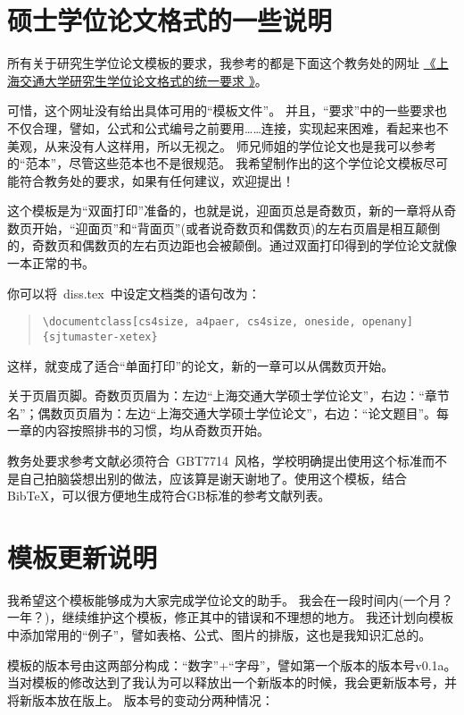 \section{硕士学位论文格式的一些说明}
\label{sec:thesisformat}

所有关于研究生学位论文模板的要求，我参考的都是下面这个教务处的网址
\href{http://www.gs.sjtu.edu.cn/policy/fileShow.ahtml?id=130}{《上海交通大学研究生学位论文格式的统一要求 》}。

可惜，这个网址没有给出具体可用的“模板文件”。
并且，``要求''中的一些要求也不仅合理，譬如，公式和公式编号之前要用……连接，实现起来困难，看起来也不美观，从来没有人这样用，所以无视之。
师兄师姐的学位论文也是我可以参考的“范本”，尽管这些范本也不是很规范。
我希望制作出的这个学位论文模板尽可能符合教务处的要求，如果有任何建议，欢迎提出！

这个模板是为``双面打印''准备的，也就是说，迎面页总是奇数页，新的一章将从奇数页开始，``迎面页''和``背面页''(或者说奇数页和偶数页)的左右页眉是相互颠倒的，奇数页和偶数页的左右页边距也会被颠倒。通过双面打印得到的学位论文就像一本正常的书。

你可以将~diss.tex~中设定文档类的语句改为：

\begin{quote}
  {\scriptsize\verb+\documentclass[cs4size, a4paer, cs4size, oneside, openany]{sjtumaster-xetex}+}
\end{quote}

这样，就变成了适合“单面打印”的论文，新的一章可以从偶数页开始。

关于页眉页脚。奇数页页眉为：左边``上海交通大学硕士学位论文''，右边：``章节名''；偶数页页眉为：左边``上海交通大学硕士学位论文''，右边：``论文题目''。每一章的内容按照排书的习惯，均从奇数页开始。

教务处要求参考文献必须符合~GBT7714~风格，学校明确提出使用这个标准而不是自己拍脑袋想出别的做法，应该算是谢天谢地了。使用这个模板，结合BibTeX，可以很方便地生成符合GB标准的参考文献列表。

\section{模板更新说明}
\label{sec:update}

我希望这个模板能够成为大家完成学位论文的助手。
我会在一段时间内(一个月？一年？)，继续维护这个模板，修正其中的错误和不理想的地方。
我还计划向模板中添加常用的``例子''，譬如表格、公式、图片的排版，这也是我知识汇总的。

模板的版本号由这两部分构成：``数字''+``字母''，譬如第一个版本的版本号v0.1a。
当对模板的修改达到了我认为可以释放出一个新版本的时候，我会更新版本号，并将新版本放在版上。
版本号的变动分两种情况：

